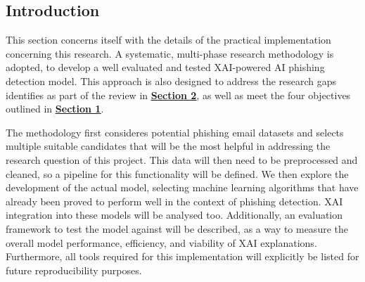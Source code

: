 
\subsection*{Introduction}
This section concerns itself with the details of the practical implementation concerning this research. A systematic, multi-phase research methodology is adopted, to develop a well evaluated and tested XAI-powered AI phishing detection model. This approach is also designed to address the research gaps identifies as part of the review in \hyperref[sec:2-literature-review]{\uline{\textbf{Section 2}}}, as well as meet the four objectives outlined in \hyperref[sec:1-introduction]{\uline{\textbf{Section 1}}}.\newline

\noindent The methodology first consideres potential phishing email datasets and selects multiple suitable candidates that will be the most helpful in addressing the research question of this project. This data will then need to be preprocessed and cleaned, so a pipeline for this functionality will be defined. We then explore the development of the actual model, selecting machine learning algorithms that have already been proved to perform well in the context of phishing detection. XAI integration into these models will be analysed too. Additionally, an evaluation framework to test the model against will be described, as a way to measure the overall model performance, efficiency, and viability of XAI explanations. Furthermore, all tools required for this implementation will explicitly be listed for future reproducibility purposes.
